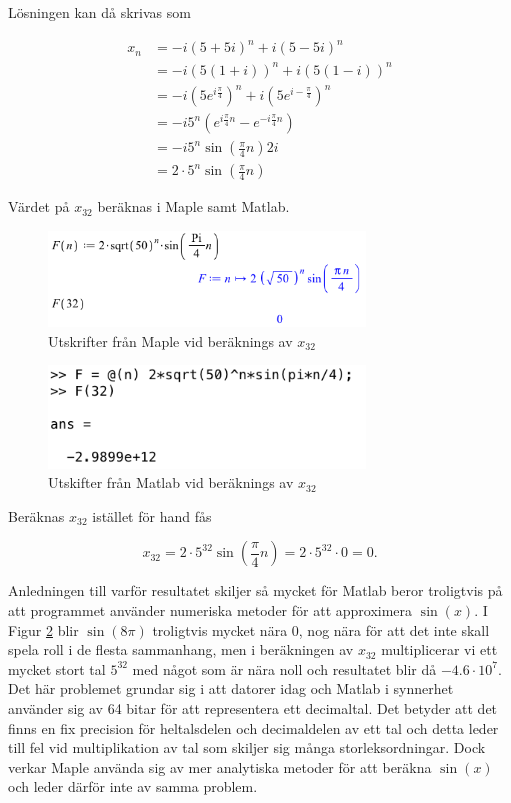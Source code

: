 \documentclass[a4paper]{article}
\begin{document}
Lösningen kan då skrivas som

\begin{align*}
	x_n		&= -i(5+5i)^n + i(5-5i)^n\\
			&= -i(5(1+i))^n + i(5(1-i))^n\\
			&= -i(5e^{i\frac{\pi}{4}})^n + i(5e^{i-\frac{\pi}{4}})^n\\
			&= -i5^n(e^{i\frac{\pi}{4}n} - e^{-i\frac{\pi}{4}n})\\
			&= -i5^n\sin\left(\frac{\pi}{4}n\right)2i\\
			&= 2\cdot5^n\sin\left(\frac{\pi}{4}n\right)
\end{align*}

Värdet på $x_{32}$ beräknas i Maple samt Matlab.

\begin{figure}[h!]
	\centering
	\includegraphics[width=0.75\textwidth]{maple.png}
	\caption{Utskrifter från Maple vid beräknings av $x_{32}$}
	\label{fig:maple}
\end{figure}

\begin{figure}[h!]
	\centering
	\includegraphics[width=0.75\textwidth]{matlab.png}
	\caption{Utskifter från Matlab vid beräknings av $x_{32}$}
	\label{fig:matlab}
\end{figure}

Beräknas $x_{32}$ istället för hand fås

\begin{equation*}
	x_{32} = 2\cdot5^{32}\sin\left(\frac{\pi}{4}n\right) = 2\cdot5^{32}\cdot 0 = 0.
\end{equation*}

Anledningen till varför resultatet skiljer så mycket för Matlab beror troligtvis på att programmet använder numeriska metoder för att approximera $\sin(x)$. I Figur \ref{fig:matlab} blir $\sin(8\pi)$ troligtvis mycket nära $0$, nog nära för att det inte skall spela roll i de flesta sammanhang, men i beräkningen av $x_{32}$ multiplicerar vi ett mycket stort tal $5^{32}$ med något som är nära noll och resultatet blir då $-4.6\cdot10^7$. Det här problemet grundar sig i att datorer idag och Matlab i synnerhet använder sig av 64 bitar för att representera ett decimaltal. Det betyder att det finns en fix precision för heltalsdelen och decimaldelen av ett tal och detta leder till fel vid multiplikation av tal som skiljer sig många storleksordningar. Dock verkar Maple använda sig av mer analytiska metoder för att beräkna $\sin(x)$ och leder därför inte av samma problem.
\end{document}

